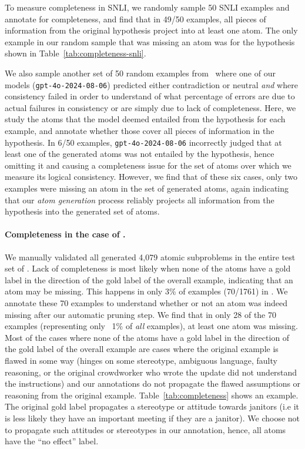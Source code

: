 To measure completeness in SNLI, we randomly sample 50 SNLI examples and annotate for completeness, and find that in 49/50 examples, all pieces of information from the original hypothesis project into at least one atom. The only example in our random sample that was missing an atom was for the hypothesis shown in Table~\ref{tab:completeness-snli}.

We also sample another set of 50 random examples from \snlitest~where one of our models (\texttt{gpt-4o-2024-08-06}) predicted either contradiction or neutral \textit{and} where consistency failed in order to understand of what percentage of errors are due to actual failures in consistency or are simply due to lack of completeness.
%
Here, we study the atoms that the model deemed entailed from the hypothesis for each example, and annotate whether those cover all pieces of information in the hypothesis.
%
In 6/50 examples, \texttt{gpt-4o-2024-08-06} incorrectly judged that at least one of the generated atoms was not entailed by the hypothesis, hence omitting it and causing a completeness issue for the set of atoms over which we measure its logical consistency. 
%
However, we find that of these six cases, only two examples were missing an atom in the set of generated atoms, again indicating that our \textit{atom generation} process reliably projects all information from the hypothesis into the generated set of atoms.


\paragraph{Completeness in the case of \dnli.} We manually validated all generated 4,079 atomic subproblems in the entire test set of \dsnlitest. 
%
Lack of completeness is most likely when none of the atoms have a gold label in the direction of the gold label of the overall example, indicating that an atom may be missing.
%
This happens in only 3\% of examples (70/1761) in \dsnlitest.
%
We annotate these 70 examples to understand whether or not an atom was indeed missing after our automatic pruning step. 
%
We find that in only 28 of the 70 examples (representing only ~1\% of \textit{all} examples), at least one atom was missing.
%
Most of the cases where none of the atoms have a gold label in the direction of the gold label of the overall example are cases where the original example is flawed in some way (hinges on some stereotype, ambiguous language, faulty reasoning, or the original crowdworker who wrote the update did not understand the instructions) and our annotations do not propagate the flawed assumptions or reasoning from the original example. Table~\ref{tab:completeness} shows an example.
The original gold label propagates a stereotype or attitude towards janitors (i.e it is less likely they have an important meeting if they are a janitor). We choose not to propagate such attitudes or stereotypes in our annotation, hence, all atoms have the ``no effect'' label.


